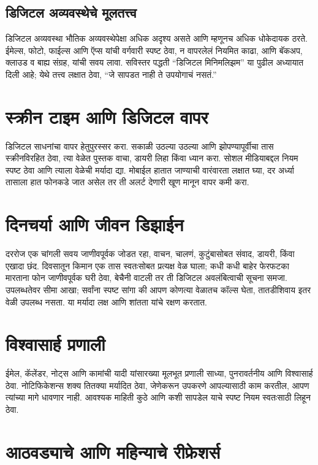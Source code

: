 \subsection*{डिजिटल अव्यवस्थेचे मूलतत्त्व}

डिजिटल अव्यवस्था भौतिक अव्यवस्थेपेक्षा अधिक अदृश्य असते आणि म्हणूनच अधिक धोकेदायक ठरते. ईमेल्स, फोटो, फाईल्स आणि ऍप्स यांची वर्गवारी स्पष्ट ठेवा, न वापरलेलं नियमित काढा, आणि बॅकअप, क्लाउड व बाह्य संग्रह, यांची सवय लावा. सविस्तर पद्धती “डिजिटल मिनिमलिझम” या पुढील अध्यायात दिली आहे; येथे तत्त्व लक्षात ठेवा, “जे सापडत नाही ते उपयोगाचं नसतं.”

\section*{स्क्रीन टाइम आणि डिजिटल वापर}

डिजिटल साधनांचा वापर हेतुपुरस्सर करा. सकाळी उठल्या उठल्या आणि झोपण्यापूर्वीचा तास स्क्रीनविरहित ठेवा, त्या वेळेत पुस्तक वाचा, डायरी लिहा किंवा ध्यान करा. सोशल मीडियाबद्दल नियम स्पष्ट ठेवा आणि त्याला वेळेची मर्यादा द्या. मोबाईल हातात जाण्याची वारंवारता लक्षात घ्या, दर अर्ध्या तासाला हात फोनकडे जात असेल तर ती अलर्ट देणारी खूण मानून वापर कमी करा.

\section*{दिनचर्या आणि जीवन डिझाईन}

दररोज एक चांगली सवय जाणीवपूर्वक जोडत रहा, वाचन, चालणं, कुटुंबासोबत संवाद, डायरी, किंवा एखादा छंद. दिवसातून किमान एक तास स्वतःसोबत प्रत्यक्ष वेळ घाला; कधी कधी बाहेर फेरफटका मारताना फोन जाणीवपूर्वक घरी ठेवा, बेचैनी वाटली तर ती डिजिटल अवलंबित्वाची सूचना समजा. उपलब्धतेवर सीमा आखा; सर्वांना स्पष्ट सांगा की आपण कोणत्या वेळातच कॉल्स घेता, तातडीशिवाय इतर वेळी उपलब्ध नसता. या मर्यादा लक्ष आणि शांतता यांचे रक्षण करतात.

\section*{विश्वासार्ह प्रणाली}

ईमेल, कॅलेंडर, नोट्स आणि कामांची यादी यांसारख्या मूलभूत प्रणाली साध्या, पुनरावर्तनीय आणि विश्वासार्ह ठेवा. नोटिफिकेशन्स शक्य तितक्या मर्यादित ठेवा, जेणेकरून उपकरणे आपल्यासाठी काम करतील, आपण त्यांच्या मागे धावणार नाही. आवश्यक माहिती कुठे आणि कशी सापडेल याचे स्पष्ट नियम स्वतःसाठी लिहून ठेवा.

\section*{आठवड्याचे आणि महिन्याचे रीफ्रेशर्स}

